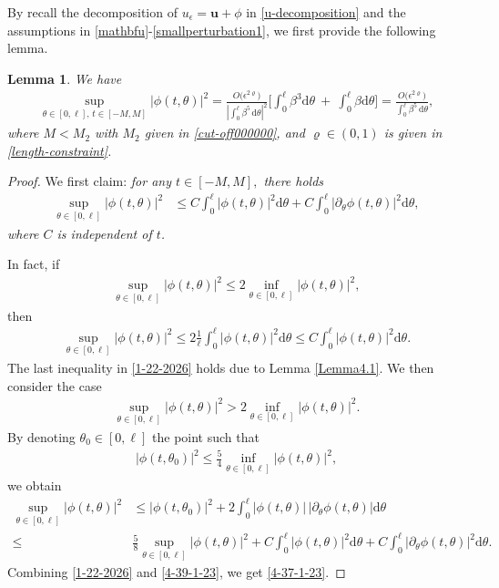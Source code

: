 \documentclass[10pt, reqno]{amsart}
\numberwithin{equation}{section}
\newtheorem{lemma}[theorem]{Lemma}
\theoremstyle{definition}
\def\p{\partial}
\begin{document}
{{By recall the decomposition of $u_\epsilon={\mathbf u}+\phi$ in \eqref{u-decomposition} and the assumptions in \eqref{mathbfu}-\eqref{smallperturbation1},
we first provide the following lemma.
\begin{lemma}\label{Lemma4-3-2026}
We have
\begin{align}\label{linftyofphittheta}
\sup_{\theta \in [0, \ell],\, t\in [-M, M]}  |\phi (t, \theta)|^2
=  \frac{O\big(\epsilon^{2\varrho}\big)}{\left|\displaystyle\int_0^{\ell}\beta^5\,{\mathrm d}\theta \right|^2}
\Bigg[ \int_0^{\ell} \beta^3 {\mathrm d}\theta
\ +\
\int_0^{\ell}\beta {\mathrm d}\theta \Bigg]
=
\frac{O\big(\epsilon^{2\varrho}\big)}{\displaystyle\int_0^{\ell}\beta^5\,{\mathrm d}\theta},
\end{align}
where $M<M_2$ with $M_2$ given in \eqref{cut-off000000}, and $\varrho\in (0, 1)$ is given in \eqref{length-constraint}.
\end{lemma}

\begin{proof}
We  first claim:
{\it for any $t\in [-M, M],  $ there holds
\begin{align}   \label{4-37-1-23}
       \sup_{\theta \in [0, \ell] }  |\phi (t, \theta)|^2 & \le   C \int_0^{\ell} |\phi (t, \theta)|^2 {\mathrm d} \theta + C  \int_0^{\ell} |\p_\theta\phi (t, \theta)|^2 {\mathrm d} \theta,
\end{align}
    where $C$ is independent of $t$.
}

\smallskip
\noindent In fact,    if
\begin{align*}
\sup_{\theta \in [0, \ell] }  |\phi (t, \theta)|^2 \le  2 \inf_{\theta \in [0, \ell] } |\phi (t, \theta)|^2,
\end{align*}
  then
\begin{align}  \label{1-22-2026}
  \sup_{\theta \in [0, \ell] }  |\phi (t, \theta)|^2  \le 2 \frac 1{\ell}  \int_0^{\ell} |\phi (t, \theta)|^2 {\mathrm d} \theta \le C\int_0^{\ell} |\phi (t, \theta)|^2 {\mathrm d} \theta.
\end{align}
  The last inequality  in \eqref{1-22-2026} holds due to Lemma \ref{Lemma4.1}.
We then consider the case
\begin{align*}
\sup_{\theta \in [0, \ell] }  |\phi (t, \theta)|^2 >  2 \inf_{\theta \in [0, \ell] } |\phi (t, \theta)|^2.
\end{align*}
  By denoting $\theta_0 \in [0, \ell]$ the point such that
\begin{align*}
    |\phi (t, \theta_0)|^2   \le \frac 54   \inf_{\theta \in [0, \ell] } |\phi (t, \theta)|^2,
\end{align*}
we obtain
\begin{align}  \label{4-39-1-23}
   \sup_{\theta \in [0, \ell] }  |\phi (t, \theta)|^2 & \le     |\phi (t, \theta_0)|^2   + 2 \int_0^{\ell} |\phi (t, \theta)|\, |\p_\theta\phi (t, \theta)| {\mathrm d} \theta\nonumber
    \\[2mm]
 \leq&   \frac 58   \sup_{\theta \in [0, \ell] } |\phi (t, \theta)|^2+     C \int_0^{\ell} |\phi (t, \theta)|^2 {\mathrm d} \theta +  C\int_0^{\ell} |\p_\theta\phi (t, \theta)|^2 {\mathrm d} \theta.
\end{align}
   Combining \eqref{1-22-2026} and \eqref{4-39-1-23},  we get  \eqref{4-37-1-23}.


\end{proof}}}
\end{document}
